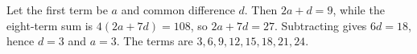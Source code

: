 Let the first term be $a$ and common difference $d$. Then $2a+d=9$, while the eight-term sum is $4(2a+7d)=108$, so $2a+7d=27$. Subtracting gives $6d=18$, hence $d=3$ and $a=3$. The terms are $\boxed{3,6,9,12,15,18,21,24}$.
